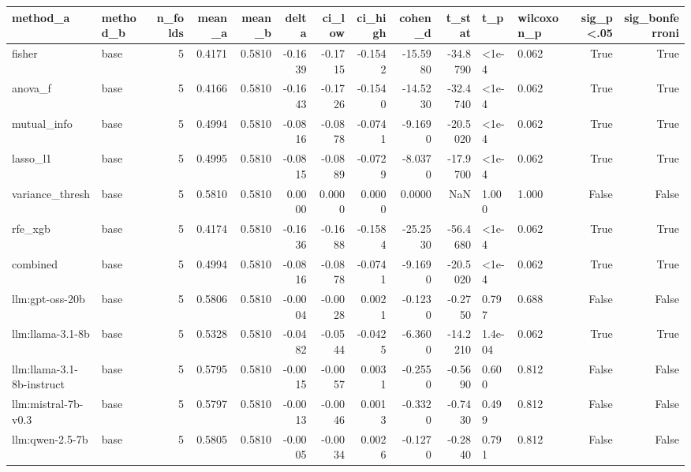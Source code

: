 \begin{tabular}{llrrrrrrrrllrr}
\toprule
method_a & method_b & n_folds & mean_a & mean_b & delta & ci_low & ci_high & cohen_d & t_stat & t_p & wilcoxon_p & sig_p<.05 & sig_bonferroni \\
\midrule
fisher & base & 5 & 0.4171 & 0.5810 & -0.1639 & -0.1715 & -0.1542 & -15.5980 & -34.8790 & <1e-4 & 0.062 & True & True \\
anova_f & base & 5 & 0.4166 & 0.5810 & -0.1643 & -0.1726 & -0.1540 & -14.5230 & -32.4740 & <1e-4 & 0.062 & True & True \\
mutual_info & base & 5 & 0.4994 & 0.5810 & -0.0816 & -0.0878 & -0.0741 & -9.1690 & -20.5020 & <1e-4 & 0.062 & True & True \\
lasso_l1 & base & 5 & 0.4995 & 0.5810 & -0.0815 & -0.0889 & -0.0729 & -8.0370 & -17.9700 & <1e-4 & 0.062 & True & True \\
variance_thresh & base & 5 & 0.5810 & 0.5810 & 0.0000 & 0.0000 & 0.0000 & 0.0000 & NaN & 1.000 & 1.000 & False & False \\
rfe_xgb & base & 5 & 0.4174 & 0.5810 & -0.1636 & -0.1688 & -0.1584 & -25.2530 & -56.4680 & <1e-4 & 0.062 & True & True \\
combined & base & 5 & 0.4994 & 0.5810 & -0.0816 & -0.0878 & -0.0741 & -9.1690 & -20.5020 & <1e-4 & 0.062 & True & True \\
llm:gpt-oss-20b & base & 5 & 0.5806 & 0.5810 & -0.0004 & -0.0028 & 0.0021 & -0.1230 & -0.2750 & 0.797 & 0.688 & False & False \\
llm:llama-3.1-8b & base & 5 & 0.5328 & 0.5810 & -0.0482 & -0.0544 & -0.0425 & -6.3600 & -14.2210 & 1.4e-04 & 0.062 & True & True \\
llm:llama-3.1-8b-instruct & base & 5 & 0.5795 & 0.5810 & -0.0015 & -0.0057 & 0.0031 & -0.2550 & -0.5690 & 0.600 & 0.812 & False & False \\
llm:mistral-7b-v0.3 & base & 5 & 0.5797 & 0.5810 & -0.0013 & -0.0046 & 0.0013 & -0.3320 & -0.7430 & 0.499 & 0.812 & False & False \\
llm:qwen-2.5-7b & base & 5 & 0.5805 & 0.5810 & -0.0005 & -0.0034 & 0.0026 & -0.1270 & -0.2840 & 0.791 & 0.812 & False & False \\
\bottomrule
\end{tabular}
